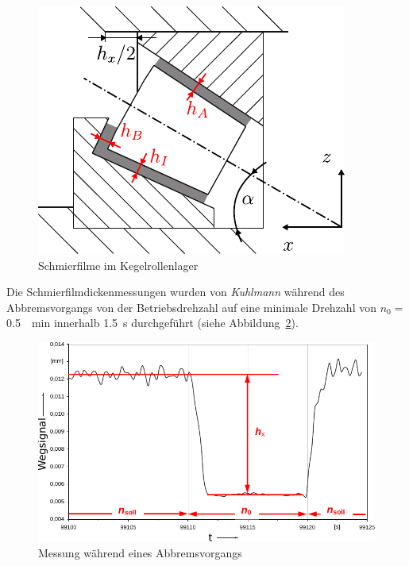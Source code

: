 \begin{figure}[htb]
    \centering
    \includegraphics[]{./images/kerola_kuhlmann.pdf}
    \caption{Schmierfilme im Kegelrollenlager~\cite{kuhlmann_2009}}
    \label{fig:kerola_kuhlmann}
\end{figure}

Die Schmierfilmdickenmessungen wurden von \textit{Kuhlmann} während des Abbremsvorgangs von der Betriebsdrehzahl auf eine minimale Drehzahl von $n_0 =$ \SI{0.5}{\per\minute} innerhalb \SI{1.5}{\second} durchgeführt (siehe Abbildung~\ref{fig:differenzmessung_kuhlmann}).

\begin{figure}[htb]
    \centering
    \includegraphics[]{./images/differenzmessung_kuhlmann.pdf}
    \caption{Messung während eines Abbremsvorgangs~\cite{kuhlmann_2009}}
    \label{fig:differenzmessung_kuhlmann}
\end{figure}

